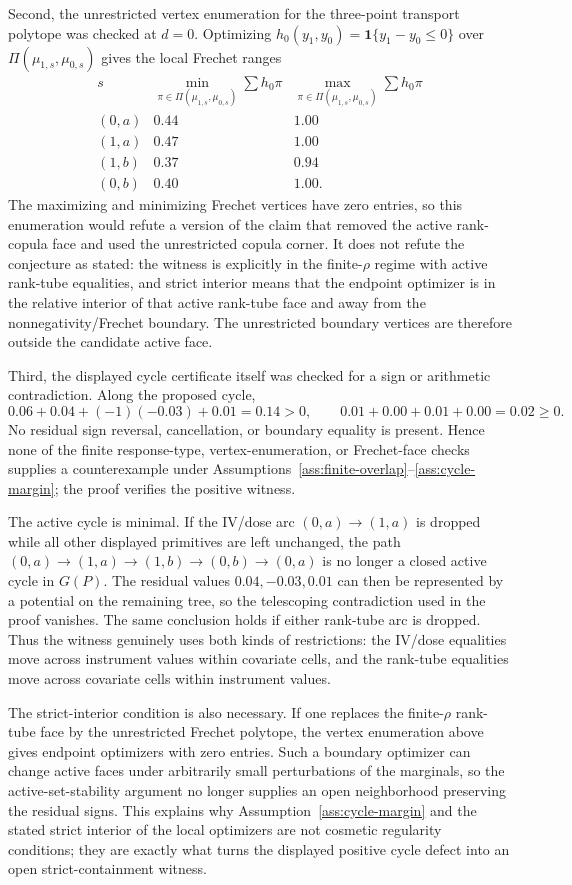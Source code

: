 \documentclass[11pt]{article}
\newcommand{\one}{\mathbf{1}}
\theoremstyle{definition}
\theoremstyle{plain}
\theoremstyle{remark}
\begin{document}
Second, the unrestricted vertex enumeration for the three-point transport polytope was checked at \(d=0\).  Optimizing \(h_0(y_1,y_0)=\one\{y_1-y_0\le0\}\) over \(\Pi(\mu_{1,s},\mu_{0,s})\) gives the local Frechet ranges
\[
\begin{array}{c|cc}
s & \min_{\pi\in\Pi(\mu_{1,s},\mu_{0,s})}\sum h_0\pi
  & \max_{\pi\in\Pi(\mu_{1,s},\mu_{0,s})}\sum h_0\pi\\ \hline
(0,a)&0.44&1.00\\
(1,a)&0.47&1.00\\
(1,b)&0.37&0.94\\
(0,b)&0.40&1.00.
\end{array}
\]
The maximizing and minimizing Frechet vertices have zero entries, so this enumeration would refute a version of the claim that removed the active rank-copula face and used the unrestricted copula corner.  It does not refute the conjecture as stated: the witness is explicitly in the finite-\(\rho\) regime with active rank-tube equalities, and strict interior means that the endpoint optimizer is in the relative interior of that active rank-tube face and away from the nonnegativity/Frechet boundary.  The unrestricted boundary vertices are therefore outside the candidate active face.

Third, the displayed cycle certificate itself was checked for a sign or arithmetic contradiction.  Along the proposed cycle,
\[
0.06+0.04+(-1)(-0.03)+0.01=0.14>0,
\qquad
0.01+0.00+0.01+0.00=0.02\ge0.
\]
No residual sign reversal, cancellation, or boundary equality is present.  Hence none of the finite response-type, vertex-enumeration, or Frechet-face checks supplies a counterexample under Assumptions~\ref{ass:finite-overlap}--\ref{ass:cycle-margin}; the proof verifies the positive witness.

The active cycle is minimal.  If the IV/dose arc \((0,a)\to(1,a)\) is dropped while all other displayed primitives are left unchanged, the path \((0,a)\to(1,a)\to(1,b)\to(0,b)\to(0,a)\) is no longer a closed active cycle in \(G(P)\).  The residual values \(0.04,-0.03,0.01\) can then be represented by a potential on the remaining tree, so the telescoping contradiction used in the proof vanishes.  The same conclusion holds if either rank-tube arc is dropped.  Thus the witness genuinely uses both kinds of restrictions: the IV/dose equalities move across instrument values within covariate cells, and the rank-tube equalities move across covariate cells within instrument values.

The strict-interior condition is also necessary.  If one replaces the finite-\(\rho\) rank-tube face by the unrestricted Frechet polytope, the vertex enumeration above gives endpoint optimizers with zero entries.  Such a boundary optimizer can change active faces under arbitrarily small perturbations of the marginals, so the active-set-stability argument no longer supplies an open neighborhood preserving the residual signs.  This explains why Assumption~\ref{ass:cycle-margin} and the stated strict interior of the local optimizers are not cosmetic regularity conditions; they are exactly what turns the displayed positive cycle defect into an open strict-containment witness.
\end{document}
